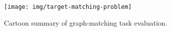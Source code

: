 \begin{figure}[!htbp]
\begin{center}

\texttt{[image: img/target-matching-problem]}
\caption{
Cartoon summary of graph-matching task evaluation.
}
\label{fig:target_matching_problem}

\end{center}
\end{figure}
